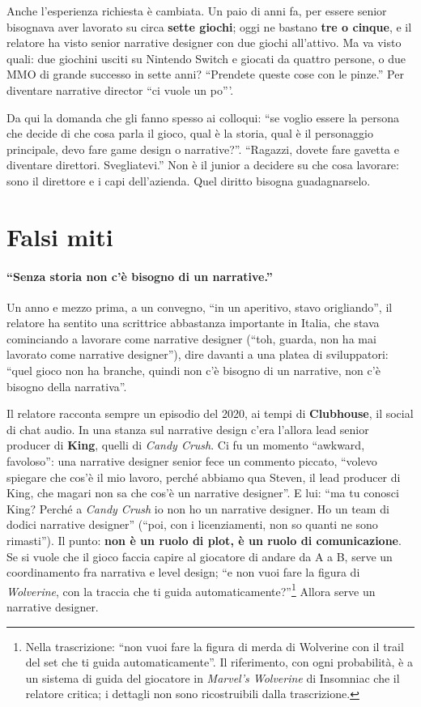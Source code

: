 Anche l'esperienza richiesta è cambiata. Un paio di anni fa, per essere
senior bisognava aver lavorato su circa \textbf{sette giochi}; oggi ne bastano
\textbf{tre o cinque}, e il relatore ha visto senior narrative designer con
due giochi all'attivo. Ma va visto quali: due giochini usciti su Nintendo
Switch e giocati da quattro persone, o due MMO di grande successo in sette
anni? ``Prendete queste cose con le pinze.'' Per diventare narrative director
``ci vuole un po'''.

Da qui la domanda che gli fanno spesso ai colloqui: ``se voglio essere la
persona che decide di che cosa parla il gioco, qual è la storia, qual è il
personaggio principale, devo fare game design o narrative?''. ``Ragazzi,
dovete fare gavetta e diventare direttori. Svegliatevi.'' Non è il junior a
decidere su che cosa lavorare: sono il direttore e i capi dell'azienda. Quel
diritto bisogna guadagnarselo.

\section{Falsi miti}
\label{p3:sec:miti}

\paragraph{``Senza storia non c'è bisogno di un narrative.''} Un anno e mezzo
prima, a un convegno, ``in un aperitivo, stavo origliando'', il relatore ha
sentito una scrittrice abbastanza importante in Italia, che stava cominciando
a lavorare come narrative designer (``toh, guarda, non ha mai lavorato come
narrative designer''), dire davanti a una platea di sviluppatori: ``quel gioco
non ha branche, quindi non c'è bisogno di un narrative, non c'è bisogno della
narrativa''.

Il relatore racconta sempre un episodio del 2020, ai tempi di
\textbf{Clubhouse}, il social di chat audio. In una stanza sul narrative
design c'era l'allora lead senior producer di \textbf{King}, quelli di
\emph{Candy Crush}. Ci fu un momento ``awkward, favoloso'': una narrative
designer senior fece un commento piccato, ``volevo spiegare che cos'è il mio
lavoro, perché abbiamo qua Steven, il lead producer di King, che magari non
sa che cos'è un narrative designer''. E lui: ``ma tu conosci King? Perché a
\emph{Candy Crush} io non ho un narrative designer. Ho un team di dodici
narrative designer'' (``poi, con i licenziamenti, non so quanti ne sono
rimasti''). Il punto: \textbf{non è un ruolo di plot, è un ruolo di
comunicazione}. Se si vuole che il gioco faccia capire al giocatore di andare
da A a B, serve un coordinamento fra narrativa e level design; ``e non vuoi
fare la figura di \emph{Wolverine}, con la traccia che ti guida
automaticamente?''\footnote{Nella trascrizione: ``non vuoi fare la figura di
merda di Wolverine con il trail del set che ti guida automaticamente''. Il
riferimento, con ogni probabilità, è a un sistema di guida del giocatore in
\emph{Marvel's Wolverine} di Insomniac che il relatore critica; i dettagli
non sono ricostruibili dalla trascrizione.} Allora serve un narrative
designer.


